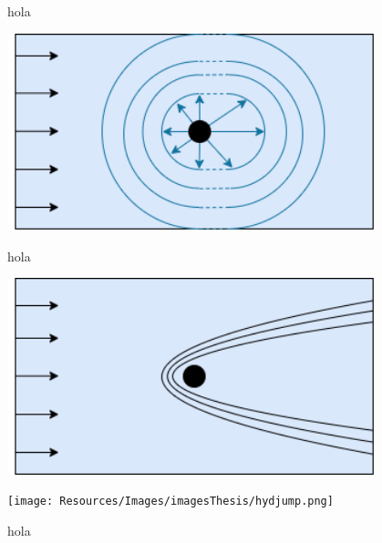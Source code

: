 \begin{frame}
\hspace{1cm}
\begin{minipage}{0.4\textwidth}
\centering
\begin{tcolorbox}[title=\centering \textbf{Subcritical flow }, colframe=TUMDarkBlue,
colback=TUMDarkBlue!30] 
hola
\end{tcolorbox}
\vspace{0.5cm}
\includegraphics[width=0.8\textwidth]{Resources/Images/subcritical.png}
\end{minipage}
\hspace{1cm}
\begin{minipage}{0.4\textwidth}
\centering
\begin{tcolorbox}[title=\centering \textbf{Supercritical flow}, colframe=TUMDarkBlue,
colback=TUMDarkBlue!30] 
hola
\end{tcolorbox}
\vspace{0.5cm}
\includegraphics[width=0.8\textwidth]{Resources/Images/supercritical.png}
\end{minipage}
\end{frame}

\clearpage



\begin{frame}

\begin{minipage}{0.5\textwidth}
\vspace{1cm}
\texttt{[image: Resources/Images/imagesThesis/hydjump.png]}
\end{minipage}
\hspace{1cm}
\begin{minipage}{0.4\textwidth}
\begin{tcolorbox}[title=\centering \textbf{Hydraulic jump}, colframe=TUMDarkBlue,
colback=TUMDarkBlue!30] 
hola
\end{tcolorbox}
\end{minipage}
\end{frame}
